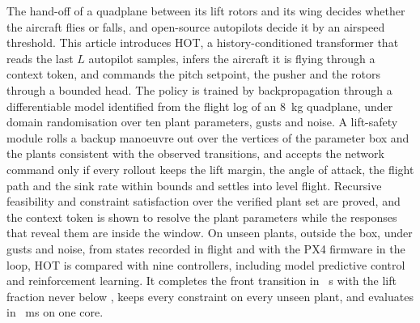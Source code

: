 The hand-off of a quadplane between its lift rotors and its wing decides whether the aircraft flies or falls, and open-source autopilots decide it by an airspeed threshold. This article introduces HOT, a history-conditioned transformer that reads the last $L$ autopilot samples, infers the aircraft it is flying through a context token, and commands the pitch setpoint, the pusher and the rotors through a bounded head. The policy is trained by backpropagation through a differentiable model identified from the flight log of an \SI{8}{kg} quadplane, under domain randomisation over ten plant parameters, gusts and noise. A lift-safety module rolls a backup manoeuvre out over the vertices of the parameter box and the plants consistent with the observed transitions, and accepts the network command only if every rollout keeps the lift margin, the angle of attack, the flight path and the sink rate within bounds and settles into level flight. Recursive feasibility and constraint satisfaction over the verified plant set are proved, and the context token is shown to resolve the plant parameters while the responses that reveal them are inside the window. On \numCross{} unseen plants, outside the box, under gusts and noise, from states recorded in flight and with the PX4 firmware in the loop, HOT is compared with nine controllers, including model predictive control and reinforcement learning. It completes the front transition in \hotFrontT{}~s with the lift fraction never below \hotFrontLf{}, keeps every constraint on every unseen plant, and evaluates in \hotEvalMs{}~ms on one core.
